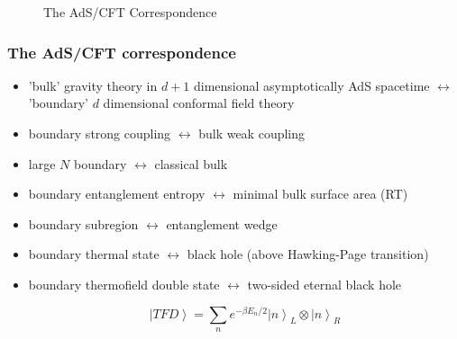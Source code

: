 \documentclass[10pt,aspectratio=169]{beamer}
\newcommand{\ket}[1]{\left| #1 \right>}
\begin{document}
\begin{frame}
\begin{minipage}[t]{0.48\linewidth}
\begin{figure}
\begin{center}
    \end{center}
    \caption{The AdS/CFT Correspondence}
\end{figure}

\end{minipage}

\end{frame}

\begin{frame}
\frametitle{The AdS/CFT correspondence}

\begin{minipage}[t]{0.48\linewidth}

\begin{itemize}

\item 'bulk' gravity theory in $d+1$ dimensional  asymptotically AdS spacetime $\leftrightarrow$ 'boundary' $d$ dimensional conformal field theory

\item boundary strong coupling $\leftrightarrow$ bulk weak coupling

\item large $N$ boundary $\leftrightarrow$ classical bulk

\item boundary entanglement entropy $\leftrightarrow$ minimal bulk surface area (RT)

\item boundary subregion $\leftrightarrow$ entanglement wedge

\item boundary thermal state $\leftrightarrow$ black hole (above Hawking-Page transition)

\item boundary thermofield double state $\leftrightarrow$ two-sided eternal black hole

$$\ket{TFD} = \sum_n e^{- \beta E_n / 2} \ket{n}_L \otimes \ket{n}_R$$

\end{itemize}

\end{minipage}
%
\hfill
%
\begin{minipage}[t]{0.48\linewidth}

\begin{figure}
    \begin{center}
    

\end{center}
\end{figure}
\end{minipage}
\end{frame}
\end{document}

